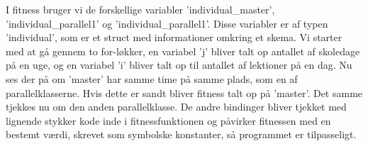 I fitness bruger vi de forskellige variabler ’individual\_master’, ’individual\_parallel1’ og ’individual\_parallel1’. Disse variabler er af typen ’individual’, som er et struct med informationer omkring et skema.
Vi starter med at gå gennem to for-løkker, en variabel ’j’ bliver talt op antallet af skoledage på en uge, og en variabel ’i’ bliver talt op til antallet af lektioner på en dag. Nu ses der på om ’master’ har samme time på samme plads, som en af parallelklasserne. Hvis dette er sandt bliver fitness talt op på ’master’. Det samme tjekkes nu om den anden parallelklasse. 
De andre bindinger bliver tjekket med lignende stykker kode inde i fitnessfunktionen og påvirker fitnessen med en bestemt værdi, skrevet som symbolske konstanter, så programmet er tilpasseligt.
